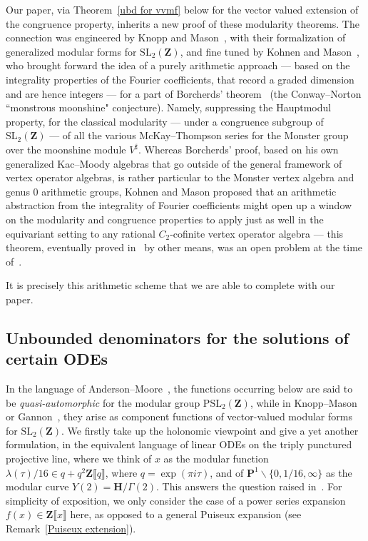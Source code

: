 \documentclass[10pt]{amsart}
\def\PSL{\mathrm{PSL}}
\def\SSS{\S}
\renewcommand\setminus{\smallsetminus}
\def\Z{\mathbf{Z}}
\renewcommand\mathbb{\mathbf}
\theoremstyle{remark}
\numberwithin{equation}{subsection}
\def\SL{\mathrm{SL}}
\def\H{\mathbf{H}}
\begin{document}
Our paper, via Theorem~\ref{ubd for vvmf} below for the vector valued extension of the congruence property, inherits a new proof of these modularity theorems. The connection was engineered by Knopp and Mason~\cite{KnoppMason}, with their formalization  of generalized modular forms for $\SL_2(\Z)$, and fine tuned by Kohnen and Mason~\cite[\SSS~4]{KohnenMason}, who
brought forward the idea of a purely arithmetic approach --- based on the integrality properties of the Fourier coefficients, that record a graded dimension  and are hence integers --- for a part of Borcherds' theorem~\cite{Borcherds} (the Conway--Norton ``monstrous moonshine" conjecture).  Namely, suppressing the Hauptmodul property, for the  classical modularity  --- under a congruence subgroup of $\SL_2(\Z)$ --- of all the various McKay--Thompson series for the Monster group over the moonshine module $V^{\sharp}$.  Whereas Borcherds' proof, based on his own generalized Kac--Moody algebras that go outside of the general framework of vertex operator algebras, is rather particular to the Monster vertex algebra and genus $0$ arithmetic groups, Kohnen and Mason proposed that an arithmetic abstraction from the integrality of Fourier coefficients might open up a window on the modularity and congruence properties to apply just as well in the equivariant setting to any rational $C_2$-cofinite vertex operator algebra --- this theorem, eventually proved in~\cite{DongLinNg, DongRen} by other means, was an  open problem at the time of~\cite{KohnenMason}. 

It is precisely this arithmetic scheme that we are able to complete with our paper. 


\subsection{Unbounded denominators for the solutions of certain ODEs}

In the language of Anderson--Moore~\cite[page~445]{AndersonMoore}, the functions   occurring below are said to be \emph{quasi-automorphic} for the modular group $\PSL_2(\Z)$, while in Knopp--Mason~\cite{KnoppMasonFourier} or Gannon~\cite{GannonVVMF}, they arise  as component functions   of vector-valued modular forms for $\SL_2(\Z)$. 
We firstly take up the holonomic viewpoint and give a yet another formulation, in the equivalent
language of linear ODEs on the triply punctured projective line, where we think of $x$ as the modular function $\lambda(\tau) / 16 \in q + q^2\Z\llbracket q\rrbracket$, where $q = \exp(\pi i \tau)$,  and of $\mathbb{P}^1 \setminus \{0,1/16,\infty\}$ as the 
modular curve $Y(2) = \H / \Gamma(2)$.  This answers the question raised in~\cite[Appendix, A.5]{Andre}. For simplicity of exposition, we only consider the case of a power series expansion $f(x) \in \Z\llbracket x \rrbracket$ here, as opposed to a general Puiseux expansion (see Remark~\ref{Puiseux extension}).
\end{document}
